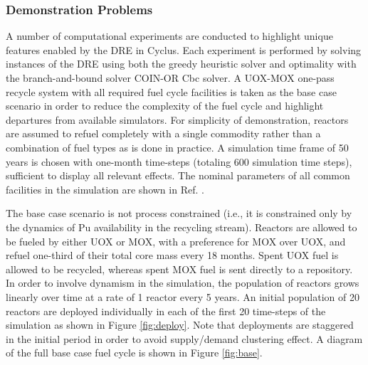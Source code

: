 
\subsubsection{Demonstration Problems}

A number of computational experiments are conducted to highlight unique
features enabled by the \gls{DRE} in Cyclus. Each experiment is performed by
solving instances of the \gls{DRE} using both the greedy heuristic solver and
optimality with the branch-and-bound solver \gls{COIN-OR} Cbc solver. A
UOX-MOX one-pass recycle system with all required fuel cycle facilities is
taken as the base case scenario in order to reduce the complexity of the fuel
cycle and highlight departures from available simulators. For simplicity of
demonstration, reactors are assumed to refuel completely with a single
commodity rather than a combination of fuel types as is done in practice. A
simulation time frame of 50 years is chosen with one-month time-steps
(totaling 600 simulation time steps), sufficient to display all relevant
effects. The nominal parameters of all common facilities in the simulation are
shown in Ref. .

The base case scenario is not process constrained (i.e., it is constrained only
by the dynamics of Pu availability in the recycling stream). Reactors are
allowed to be fueled by either UOX or MOX, with a preference for MOX over UOX,
and refuel one-third of their total core mass every 18 months. Spent UOX fuel is
allowed to be recycled, whereas spent MOX fuel is sent directly to a
repository. In order to involve dynamism in the simulation, the population
of reactors grows linearly over time at a rate of 1 reactor every 5 years. An
initial population of 20 reactors are deployed individually in each of the first
20 time-steps of the simulation as shown in Figure \ref{fig:deploy}. Note that
deployments are staggered in the initial period in order to avoid supply/demand
clustering effect. A diagram of the full base case fuel cycle is shown in Figure
\ref{fig:base}.

